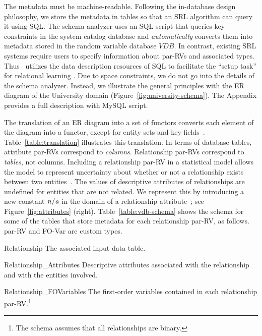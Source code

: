 \documentclass{IEEEtran}
\begin{document}
The metadata must be machine-readable. Following the in-database design philosophy, we store the metadata in tables so that an SRL algorithm can query it using SQL. The schema analyzer uses an SQL script that queries key constraints in the system catalog database and {\em automatically} converts them into metadata stored in the random variable database $VDB$. In contrast, existing SRL systems require users to specify information about par-RVs and associated types. 
Thus \FB\  utilizes the data description resources of SQL to facilitate the ``setup task'' for relational learning \cite{Walker2010}. Due to space constraints, we do not go into the details of the schema analyzer. Instead, we illustrate the general principles with the ER diagram of the University domain (Figure~\ref{fig:university-schema}). The Appendix  provides a full description with MySQL script. 

The translation of an ER diagram into a set of functors converts each element of the diagram into a functor, except for entity sets and key fields~\cite{Heckerman+al:SRL07}. Table~\ref{table:translation} illustrates this translation. In terms of database tables, attribute par-RVs correspond to {\em columns}. Relationship par-RVs correspond to {\em tables}, not columns. Including a relationship par-RV in a statistical model allows the model to represent uncertainty about whether or not a relationship exists between two entities~\cite{Kimmig2015}. The values of descriptive attributes of relationships are undefined for entities that are not related. We represent this by introducing a new constant $\it{n/a}$ in the domain of a relationship attribute~\cite{Milch2005}; see Figure~\ref{fig:attributes} (right). Table~\ref{table:vdb-schema} shows the schema for some of the tables that store metadata for 
each relationship par-RV, as follows. par-RV and FO-Var are custom types.

\begin{LaTeXdescription}
\item[Relationship] The associated input data table.
\item[Relationship\_Attributes] Descriptive attributes associated with the relationship and with the entities involved.
\item[Relationship\_FOVariables] The first-order variables contained in each relationship par-RV.\footnote{The schema assumes that all relationships are binary.}
\end{LaTeXdescription}
\end{document}
